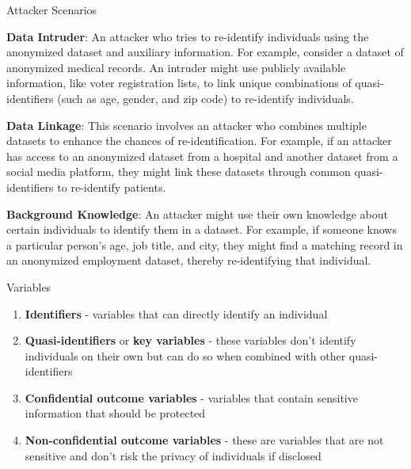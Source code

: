 \documentclass[
	aspectratio = 169
 ]{beamer}
\begin{document}
\begin{frame}{Attacker Scenarios}

\textbf{Data Intruder}: An attacker who tries to re-identify individuals
using the anonymized dataset and auxiliary information. For example,
consider a dataset of anonymized medical records. An intruder might use
publicly available information, like voter registration lists, to link
unique combinations of quasi-identifiers (such as age, gender, and zip
code) to re-identify individuals.

\textbf{Data Linkage}: This scenario involves an attacker who combines
multiple datasets to enhance the chances of re-identification. For
example, if an attacker has access to an anonymized dataset from a
hospital and another dataset from a social media platform, they might
link these datasets through common quasi-identifiers to re-identify
patients.

\textbf{Background Knowledge}: An attacker might use their own knowledge
about certain individuals to identify them in a dataset. For example, if
someone knows a particular person's age, job title, and city, they might
find a matching record in an anonymized employment dataset, thereby
re-identifying that individual.

\end{frame}
\begin{frame}{Variables}

\begin{enumerate}
\item
  \textbf{Identifiers} - variables that can directly identify an
  individual
\item
  \textbf{Quasi-identifiers} or \textbf{key variables} - these variables
  don't identify individuals on their own but can do so when combined
  with other quasi-identifiers
\item
  \textbf{Confidential outcome variables} - variables that contain
  sensitive information that should be protected
\item
  \textbf{Non-confidential outcome variables} - these are variables that
  are not sensitive and don't risk the privacy of individuals if
  disclosed
\end{enumerate}

\end{frame}
\end{document}
